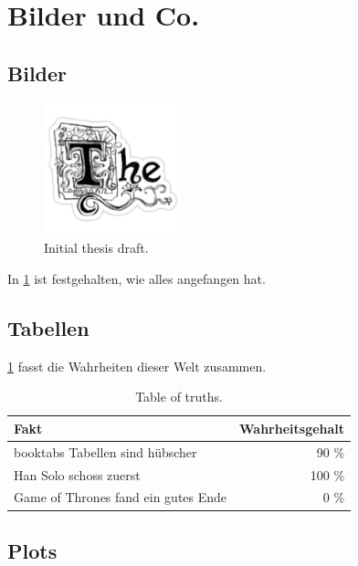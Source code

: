 \section{Bilder und Co.}

\subsection{Bilder}%
\label{sec:figures}

\begin{figure}[h]
  \includegraphics[width=4cm]{fig/the.png}
  \caption{Initial thesis draft.}%
  \label{fig:initial-draft}
\end{figure}

In \cref{fig:initial-draft} ist festgehalten,
wie alles angefangen hat.


\subsection{Tabellen}%
\label{sec:tables}

\cref{table:truths} fasst die Wahrheiten dieser Welt zusammen.

\begin{table}[ht]
  \begin{center}
    \begin{tabular}{lr}
      \toprule
      Fakt                                & Wahrheitsgehalt \\
      \midrule
      booktabs Tabellen sind hübscher     & 90 \%           \\
      Han Solo schoss zuerst              & 100 \%          \\
      Game of Thrones fand ein gutes Ende & 0 \%            \\
      \bottomrule
    \end{tabular}
    \caption{Table of truths.}%
    \label{table:truths}
  \end{center}
\end{table}

\subsection{Plots}%
\label{sec:plot}

